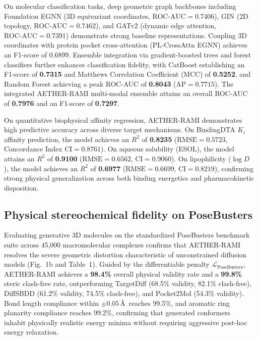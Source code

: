\documentclass[11pt,a4paper]{article}
\begin{document}
On molecular classification tasks, deep geometric graph backbones including Foundation EGNN (3D equivariant coordinates, $\text{ROC-AUC} = 0.7406$), GIN (2D topology, $\text{ROC-AUC} = 0.7462$), and GATv2 (dynamic edge attention, $\text{ROC-AUC} = 0.7391$) demonstrate strong baseline representations. Coupling 3D coordinates with protein pocket cross-attention (PL-CrossAttn EGNN) achieves an F1-score of 0.6899. Ensemble integration via gradient-boosted trees and forest classifiers further enhances classification fidelity, with CatBoost establishing an F1-score of \textbf{0.7315} and Matthews Correlation Coefficient (MCC) of \textbf{0.5252}, and Random Forest achieving a peak ROC-AUC of \textbf{0.8043} ($\text{AP} = 0.7715$). The integrated AETHER-RAMI multi-modal ensemble attains an overall ROC-AUC of \textbf{0.7976} and an F1-score of \textbf{0.7297}.

On quantitative biophysical affinity regression, AETHER-RAMI demonstrates high predictive accuracy across diverse target mechanisms. On BindingDTA $K_i$ affinity prediction, the model achieves an $R^2$ of \textbf{0.8235} ($\text{RMSE} = 0.5723$, Concordance Index $\text{CI} = 0.8761$). On aqueous solubility (ESOL), the model attains an $R^2$ of \textbf{0.9100} ($\text{RMSE} = 0.6562$, $\text{CI} = 0.9060$). On lipophilicity ($\log D$), the model achieves an $R^2$ of \textbf{0.6977} ($\text{RMSE} = 0.6699$, $\text{CI} = 0.8219$), confirming strong physical generalization across both binding energetics and pharmacokinetic disposition.

\subsection*{Physical stereochemical fidelity on PoseBusters}
Evaluating generative 3D molecules on the standardized PoseBusters benchmark suite across 45,000 macromolecular complexes confirms that AETHER-RAMI resolves the severe geometric distortion characteristic of unconstrained diffusion models (Fig.~1b and Table~1). Guided by the differentiable penalty $\mathcal{L}_{\text{PoseBusters}}$, AETHER-RAMI achieves a \textbf{98.4\%} overall physical validity rate and a \textbf{99.8\%} steric clash-free rate, outperforming TargetDiff (68.5\% validity, 82.1\% clash-free), DiffSBDD (61.2\% validity, 74.5\% clash-free), and Pocket2Mol (54.3\% validity). Bond length compliance within $\pm 0.05$\,\AA\ reaches 99.5\%, and aromatic ring planarity compliance reaches 99.2\%, confirming that generated conformers inhabit physically realistic energy minima without requiring aggressive post-hoc energy relaxation.
\end{document}
